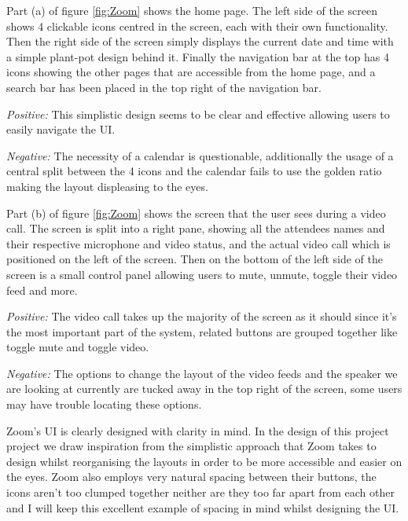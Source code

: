 Part (a) of figure \ref{fig:Zoom} shows the
home page. The left side of the screen shows 4
clickable icons centred in the screen, each with their own
functionality. Then the right side of the screen simply
displays the current date and time with a simple plant-pot
design behind it. Finally the navigation bar at the top has
4 icons showing the other pages that are accessible from the
home page, and a search bar has been placed in the top right
of the navigation bar.\\ \vspace{0.2cm}

\textit{Positive:} This simplistic design seems to be
clear and effective allowing users to easily navigate the UI.
\\ \vspace{0.2cm}

\textit{Negative:} The necessity of a calendar is questionable,
additionally the usage of a central split between the 4 icons
and the calendar fails to use the golden ratio making the
layout displeasing to the eyes.
\\ \vspace{0.2cm}

Part (b) of figure \ref{fig:Zoom} shows the screen that the
user sees during a video call. The screen is split into a
right pane, showing all the attendees names and their
respective microphone and video status, and the actual video
call which is positioned on the left of the screen. Then on
the bottom of the left side of the screen is a small control
panel allowing users to mute, unmute, toggle their video feed
and more. \\ \vspace{0.2cm}

\textit{Positive:} The video call takes up the majority of
the screen as it should since it's the most important
part of the system, related buttons are grouped together
like toggle mute and toggle video. \\ \vspace{0.2cm}

\textit{Negative:} The options to change the layout of the
video feeds and the speaker we are looking at currently are
tucked away in the top right of the screen, some users may
have trouble locating these options. \\ \vspace{0.2cm}

Zoom's UI is clearly designed with clarity in mind. In the
design of this project
project we draw inspiration from the simplistic approach
that Zoom takes to design whilst reorganising the layouts in
order to be more accessible and easier on the eyes. Zoom also
employs very natural spacing between their buttons, the icons
aren't too clumped together neither are they too far apart from
each other and I will keep this excellent example of spacing
in mind whilst designing the UI.

